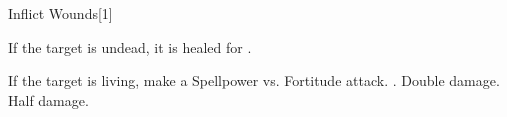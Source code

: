 \begin{spellsection}{Inflict Wounds}[1]
    \begin{spellheader}
    \end{spellheader}
    \begin{spellcontent}
        \begin{spelltargetinginfo}
        \end{spelltargetinginfo}
        \begin{spelleffects}
            \spelleffect If the target is undead, it is healed for \spelldamage{}.
            \begin{spellattacktriggered}{If the target is living, make a Spellpower vs. Fortitude attack.}
                \spellsuccess {}.
                \spellcritical Double damage.
                \spellfailure Half damage.
            \end{spellattacktriggered}
        \end{spelleffects}
    \end{spellcontent}
    \begin{spellfooter}
        \miscastrandom
    \end{spellfooter}
    \begin{spellaugments}
    \end{spellaugments}
\end{spellsection}

